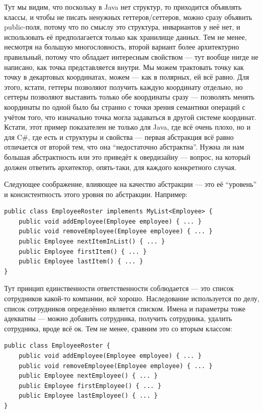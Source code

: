 \documentclass[a5paper]{article}
\begin{document}
Тут мы видим, что поскольку в Java нет структур, то приходится объявлять классы, и чтобы не писать ненужных геттеров/сеттеров, можно сразу объявить public-поля, потому что по смыслу это структура, инвариантов у неё нет, и использовать её предполагается только как хранилище данных. Тем не менее, несмотря на большую многословность, второй вариант более архитектурно правильный, потому что обладает интересным свойством --- тут вообще нигде не написано, как точка представляется внутри. Мы можем трактовать точку как точку в декартовых координатах, можем --- как в полярных, ей всё равно. Для этого, кстати, геттеры позволяют получить каждую координату отдельно, но сеттеры позволяют выставить только обе координаты сразу --- позволять менять координаты по одной было бы странно с точки зрения семантики операций с учётом того, что изначально точка могла задаваться в другой системе координат. Кстати, этот пример показателен не только для Java, где всё очень плохо, но и для C\#, где есть и структуры и свойства --- первая абстракция всё равно отличается от второй тем, что она ``недостаточно абстрактна''. Нужна ли нам большая абстрактность или это приведёт к овердизайну --- вопрос, на который должен ответить архитектор, опять-таки, для каждого конкретного случая.

Следующее соображение, влияющее на качество абстракции --- это её ``уровень'' и консистентность этого уровня по абстракции. Например:

\begin{verbatim}
public class EmployeeRoster implements MyList<Employee> {
    public void addEmployee(Employee employee) { ... }
    public void removeEmployee(Employee employee) { ... }
    public Employee nextItemInList() { ... }
    public Employee firstItem() { ... }
    public Employee lastItem() { ... }
}
\end{verbatim}

Тут принцип единственности ответственности соблюдается --- это список сотрудников какой-то компании, всё хорошо. Наследование используется по делу, список сотрудников определённо является списком. Имена и параметры тоже адекватны --- можно добавить сотрудника, получить сотрудника, удалить сотрудника, вроде всё ок. Тем не менее, сравним это со вторым классом:

\begin{verbatim}
public class EmployeeRoster {
    public void addEmployee(Employee employee) { ... }
    public void removeEmployee(Employee employee) { ... }
    public Employee nextEmployee() { ... }
    public Employee firstEmployee() { ... }
    public Employee lastEmployee() { ... }
}
\end{verbatim}
\end{document}
